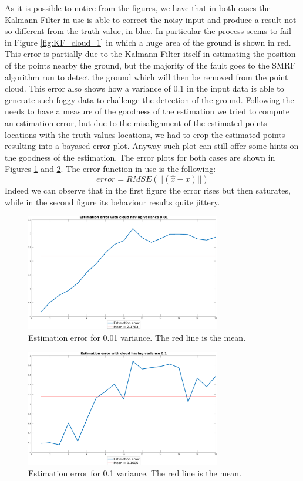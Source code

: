 \documentclass[twocolumn, a4paper]{article}
\begin{document}
\newpage
As it is possible to notice from the figures, we have that in both cases the
Kalmann Filter in use is able to correct the noisy input and produce a result
not so different from the truth value, in blue. In particular the process
seems to fail in Figure \ref{fig:KF_cloud_1} in which a huge area of the
ground is shown in red. This error is partially due to the Kalmann Filter
itself in estimating the position of the points nearby the ground, but the
majority of the fault goes to the SMRF algorithm run to detect the ground
which will then be removed from the point cloud. This error also shows how
a variance of 0.1 in the input data is able to generate such foggy data to
challenge the detection of the ground.
Following the needs to have a measure of the goodness of the estimation
we tried to compute an estimation error, but due to the misalignment of the
estimated points locations with the truth values locations, we had to crop
the estimated points resulting into a bayased error plot. Anyway such plot
can still offer some hints on the goodness of the estimation.
The error plots for both cases are shown in Figures \ref{fig:KF_err_01} and
\ref{fig:KF_err_1}. The error function in use is the following:
\begin{equation}
    error = RMSE(||(\hat{x} - x)||)
\end{equation}
Indeed we can observe that in the first figure the error rises but then 
saturates, while in the second figure its behaviour results quite jittery.
\newpage
\begin{figure}[h!]
    \centering
    \includegraphics[width=8.5cm]{"../Report_images/Denoising_KF_cloud01_error.png"}
    \caption{Estimation error for 0.01 variance. The red line is the mean.}
    \label{fig:KF_err_01}
\end{figure}
\vspace{0.3cm}
\begin{figure}[h!]
    \centering
    \includegraphics[width=8.5cm]{"../Report_images/Denoising_KF_cloud1_error.png"}
    \caption{Estimation error for 0.1 variance. The red line is the mean.}
    \label{fig:KF_err_1}
\end{figure}
\end{document}
